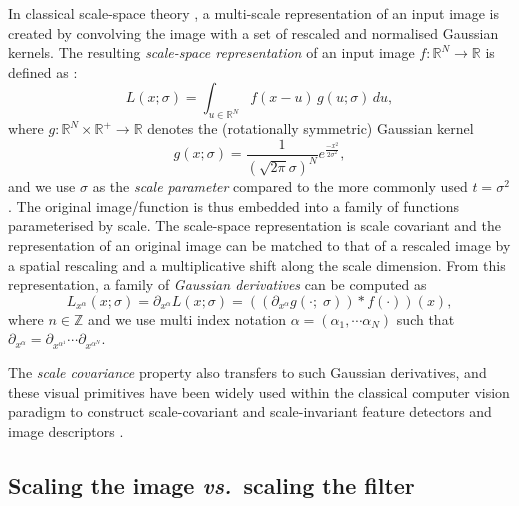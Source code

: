 \documentclass[twocolumn,runningheads]{svjour3}
\def\bbbr{{\mathbb R}}
\begin{document}
In classical scale-space theory 
\cite{Iij62,Wit83,Koe84,KoeDoo92-PAMI,Lin93-Dis,Lin94-SI,Flo97-book,WeiIshImi99-JMIV,Haa04-book,DuiFloGraRom04-JMIV,Lin10-JMIV},
a multi-scale representation of an input image is created by
convolving the image with a set of rescaled and normalised Gaussian
kernels. The resulting {\em scale-space representation\/}
of an input image $f: \mathbb{R}^N \to \mathbb{R}$ is defined as
\cite{Lin93-Dis}:
\begin{equation}
L(x; \sigma) = \int_{u \in \bbbr^N} f(x - u)\,g(u; \sigma)\,du,
\end{equation}
where $g: \bbbr^N\times\bbbr^+ \to \bbbr$ denotes the (rotationally symmetric) Gaussian kernel
\begin{equation}
g(x;\sigma) =  \frac{1}{(\sqrt{2\pi} \sigma)^{N}}  e^{\frac{-x^2}{2 \sigma^2}},
\end{equation}
and we use $\sigma$ as the {\em scale parameter} compared to the
more commonly used $t = \sigma^2$. The original image/function is thus embedded into a family of functions parameterised by scale. The scale-space representation is scale covariant and the representation of an original image can be matched to that of a rescaled image by a spatial rescaling and a multiplicative shift along the scale dimension.
From this representation, a family of {\em Gaussian derivatives} can
be computed as
\begin{equation}
L_{x^{\alpha}}(x;\sigma) = \partial_{x^\alpha} L(x;\sigma) = ((\partial_{x^{\alpha}} g(\cdot;\; \sigma)) * f(\cdot))(x),
\end{equation}
where $n \in \mathbb{Z}$ and we use multi index notation 
$\alpha = (\alpha_1, \cdots \alpha_N)$ such that
$\partial_{x^\alpha} = \partial_{x^{\alpha^1}}
\cdots \partial_{x^{\alpha^N}}$. 

The \emph{scale covariance} property also transfers to such Gaussian derivatives, and 
these visual primitives have been widely used within the classical
computer vision paradigm to construct scale-covariant and
scale-invariant feature detectors and image descriptors
\cite{Lin97-IJCV,Lin98-IJCV,BL97-CVIU,ChoVerHalCro00-ECCV,MikSch04-IJCV,Low04-IJCV,BayEssTuyGoo08-CVIU,TuyMik08-Book,Lin13-ImPhys,Lin15-JMIV}. 

\subsection{Scaling the image {\em vs.\/}\ scaling the filter}
\label{sec:scaling-image-v-filter}
\end{document}
